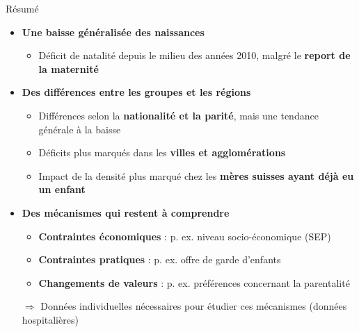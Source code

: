 \documentclass[aspectratio=169,9pt]{beamer}
\newcommand{\compresslist}{%
  \setlength{\itemsep}{2pt}%
  \setlength{\parskip}{0pt}%
  \setlength{\parsep}{0pt}%
}
\begin{document}
\begin{frame}{Résumé}

\begin{itemize}\compresslist

\item \textbf{Une baisse généralisée des naissances}
  \begin{itemize}\compresslist
  \item Déficit de natalité depuis le milieu des années 2010, malgré le \textbf{report de la maternité}
  \end{itemize}
\vspace{0.2cm}
\item \textbf{Des différences entre les groupes et les régions}
  \begin{itemize}\compresslist
  \item Différences selon la \textbf{nationalité et la parité}, mais une tendance générale à la baisse
  \item Déficits plus marqués dans les \textbf{villes et agglomérations}
  \item Impact de la densité plus marqué chez les \textbf{mères suisses ayant déjà eu un enfant}
  \end{itemize}
\vspace{0.2cm}
\item \textbf{Des mécanismes qui restent à comprendre}
  \begin{itemize}\compresslist
  \item \textbf{Contraintes économiques} : p. ex. niveau socio-économique (SEP)
  \item \textbf{Contraintes pratiques} : p. ex. offre de garde d'enfants
  \item \textbf{Changements de valeurs} : p. ex. préférences concernant la parentalité
  \end{itemize}
  $\Rightarrow$ Données individuelles nécessaires pour étudier ces mécanismes (données hospitalières)
\end{itemize}
\end{frame}
\end{document}
